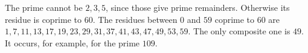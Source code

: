 The prime cannot be $2,3,5$, since those give prime remainders. Otherwise its residue is coprime to $60$. The residues between $0$ and $59$ coprime to $60$ are $1,7,11,13,17,19,23,29,31,37,41,43,47,49,53,59$. The only composite one is $\boxed{49}$. It occurs, for example, for the prime $109$.
